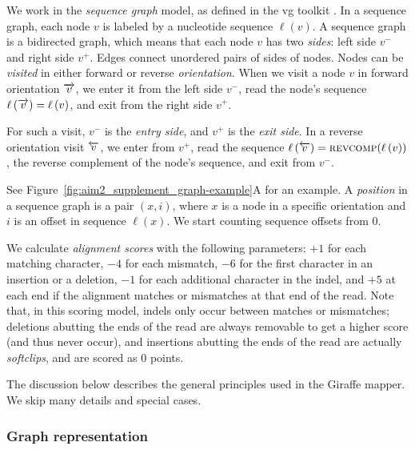 \documentclass[11pt]{ucscthesis}
\newcommand{\nodelabel}[1]{\ensuremath{\ell\left( #1 \right)}}
\newcommand{\leftside}[1]{\ensuremath{{ #1 }^{-}}}
\newcommand{\rightside}[1]{\ensuremath{{ #1 }^{+}}}
\newcommand{\forwardnode}[1]{\ensuremath{\protect\overrightarrow{ #1 }}}
\newcommand{\reversenode}[1]{\ensuremath{\protect\overleftarrow{ #1 }}}
\newcommand{\reversecomplement}[1]{\ensuremath{\textsc{revcomp}({ #1 })}}
\newcommand{\vocab}[1]{\emph{#1}}
\begin{document}
We work in the \vocab{sequence graph} model, as defined in the vg toolkit \cite{garrison_vg_2018}.
In a sequence graph, each node $v$ is labeled by a nucleotide sequence $\nodelabel{v}$.
A sequence graph is a bidirected graph, which means that each node $v$ has two \vocab{sides}: left side $\leftside{v}$ and right side $\rightside{v}$.
Edges connect unordered pairs of sides of nodes.
Nodes can be \vocab{visited} in either forward or reverse \vocab{orientation}.
When we visit a node $v$ in forward orientation $\forwardnode{v}$, we enter it from the left side $\leftside{v}$, read the node's sequence $\nodelabel{\forwardnode{v}} = \nodelabel{v}$, and exit from the right side $\rightside{v}$.

For such a visit, $\leftside{v}$ is the \vocab{entry side}, and $\rightside{v}$ is the \vocab{exit side}.
In a reverse orientation visit $\reversenode{v}$, we enter from $\rightside{v}$, read the sequence $\nodelabel{\reversenode{v}} = \reversecomplement{\nodelabel{v}}$, the reverse complement of the node's sequence, and exit from $\leftside{v}$.
\ifdefined\HCode
    \par
\fi
See Figure~\ref{fig:aim2_supplement_graph-example}A for an example.
A \vocab{position} in a sequence graph is a pair $(x, i)$, where $x$ is a node in a specific orientation and $i$ is an offset in sequence $\nodelabel{x}$.
We start counting sequence offsets from $0$.

We calculate \vocab{alignment scores} with the following parameters: $+1$ for each matching character, $-4$ for each mismatch, $-6$ for the first character in an insertion or a deletion, $-1$ for each additional character in the indel, and $+5$ at each end if the alignment matches or mismatches at that end of the read.
Note that, in this scoring model, indels only occur between matches or mismatches; deletions abutting the ends of the read are always removable to get a higher score (and thus never occur), and insertions abutting the ends of the read are actually \vocab{softclips}, and are scored as 0 points.

The discussion below describes the general principles used in the Giraffe mapper.
We skip many details and special cases.



\subsubsection{Graph representation}
\end{document}
